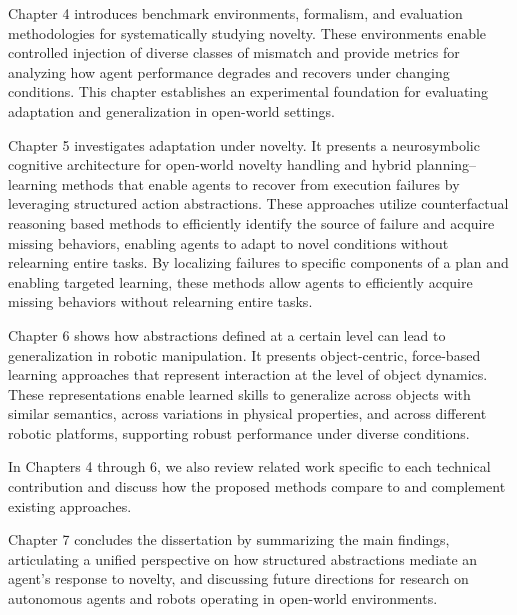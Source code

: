Chapter 4 introduces benchmark environments, formalism, and evaluation methodologies for systematically studying novelty. These environments enable controlled injection of diverse classes of mismatch and provide metrics for analyzing how agent performance degrades and recovers under changing conditions. This chapter establishes an experimental foundation for evaluating adaptation and generalization in open-world settings.

Chapter 5 investigates adaptation under novelty. It presents a neurosymbolic cognitive architecture for open-world novelty handling and hybrid planning--learning methods that enable agents to recover from execution failures by leveraging structured action abstractions. These approaches utilize counterfactual reasoning based methods to efficiently identify the source of failure and acquire missing behaviors, enabling agents to adapt to novel conditions without relearning entire tasks. By localizing failures to specific components of a plan and enabling targeted learning, these methods allow agents to efficiently acquire missing behaviors without relearning entire tasks.

Chapter 6 shows how abstractions defined at a certain level can lead to generalization in robotic manipulation. It presents object-centric, force-based learning approaches that represent interaction at the level of object dynamics. These representations enable learned skills to generalize across objects with similar semantics, across variations in physical properties, and across different robotic platforms, supporting robust performance under diverse conditions.

In Chapters 4 through 6, we also review related work specific to each technical contribution and discuss how the proposed methods compare to and complement existing approaches.

Chapter 7 concludes the dissertation by summarizing the main findings, articulating a unified perspective on how structured abstractions mediate an agent's response to novelty, and discussing future directions for research on autonomous agents and robots operating in open-world environments.
